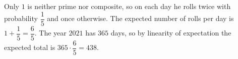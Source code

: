Only $1$ is neither prime nor composite, so on each day he rolls twice with probability $\dfrac15$ and once otherwise. The expected number of rolls per day is $1+\dfrac15=\dfrac65$. The year $2021$ has $365$ days, so by linearity of expectation the expected total is $365\cdot\dfrac65=\boxed{438}$.
